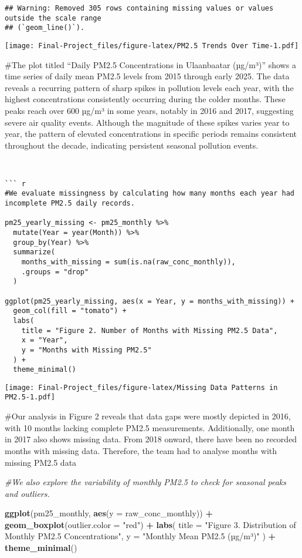 \documentclass[
]{article}
\newenvironment{Shaded}{\begin{snugshade}}{\end{snugshade}}
\newcommand{\AttributeTok}[1]{\textcolor[rgb]{0.13,0.29,0.53}{#1}}
\newcommand{\CommentTok}[1]{\textcolor[rgb]{0.56,0.35,0.01}{\textit{#1}}}
\newcommand{\FunctionTok}[1]{\textcolor[rgb]{0.13,0.29,0.53}{\textbf{#1}}}
\newcommand{\NormalTok}[1]{#1}
\newcommand{\SpecialCharTok}[1]{\textcolor[rgb]{0.81,0.36,0.00}{\textbf{#1}}}
\newcommand{\StringTok}[1]{\textcolor[rgb]{0.31,0.60,0.02}{#1}}
\begin{document}
\begin{verbatim}
## Warning: Removed 305 rows containing missing values or values outside the scale range
## (`geom_line()`).
\end{verbatim}

\texttt{[image: Final-Project\_files/figure-latex/PM2.5 Trends Over Time-1.pdf]}

\#The plot titled ``Daily PM2.5 Concentrations in Ulaanbaatar (µg/m³)''
shows a time series of daily mean PM2.5 levels from 2015 through early
2025. The data reveals a recurring pattern of sharp spikes in pollution
levels each year, with the highest concentrations consistently occurring
during the colder months. These peaks reach over 600 µg/m³ in some
years, notably in 2016 and 2017, suggesting severe air quality events.
Although the magnitude of these spikes varies year to year, the pattern
of elevated concentrations in specific periods remains consistent
throughout the decade, indicating persistent seasonal pollution events.

\begin{verbatim}


``` r
#We evaluate missingness by calculating how many months each year had incomplete PM2.5 daily records.

pm25_yearly_missing <- pm25_monthly %>%
  mutate(Year = year(Month)) %>%
  group_by(Year) %>%
  summarize(
    months_with_missing = sum(is.na(raw_conc_monthly)),
    .groups = "drop"
  )

ggplot(pm25_yearly_missing, aes(x = Year, y = months_with_missing)) +
  geom_col(fill = "tomato") +
  labs(
    title = "Figure 2. Number of Months with Missing PM2.5 Data",
    x = "Year",
    y = "Months with Missing PM2.5"
  ) +
  theme_minimal()
\end{verbatim}

\texttt{[image: Final-Project\_files/figure-latex/Missing Data Patterns in PM2.5-1.pdf]}

\#Our analysis in Figure 2 reveals that data gaps were mostly depicted
in 2016, with 10 months lacking complete PM2.5 measurements.
Additionally, one month in 2017 also shows missing data. From 2018
onward, there have been no recorded months with missing data. Therefore,
the team had to analyse months with missing PM2.5 data

\begin{Shaded}
\begin{Highlighting}[]
\CommentTok{\#We also explore the variability of monthly PM2.5 to check for seasonal peaks and outliers.}

\FunctionTok{ggplot}\NormalTok{(pm25\_monthly, }\FunctionTok{aes}\NormalTok{(}\AttributeTok{y =}\NormalTok{ raw\_conc\_monthly)) }\SpecialCharTok{+}
  \FunctionTok{geom\_boxplot}\NormalTok{(}\AttributeTok{outlier.color =} \StringTok{"red"}\NormalTok{) }\SpecialCharTok{+}
  \FunctionTok{labs}\NormalTok{(}
    \AttributeTok{title =} \StringTok{"Figure 3. Distribution of Monthly PM2.5 Concentrations"}\NormalTok{,}
    \AttributeTok{y =} \StringTok{"Monthly Mean PM2.5 (µg/m³)"}
\NormalTok{  ) }\SpecialCharTok{+}
  \FunctionTok{theme\_minimal}\NormalTok{()}
\end{Highlighting}
\end{Shaded}
\end{document}
